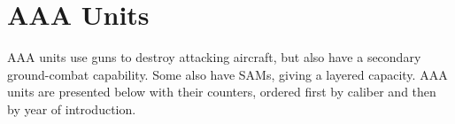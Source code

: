 
\chapter{AAA Units}


AAA units use guns to destroy attacking aircraft, but also have a secondary ground-combat capability. Some also have SAMs, giving a layered capacity. AAA units are presented below with their counters, ordered first by caliber and then by year of introduction.%

